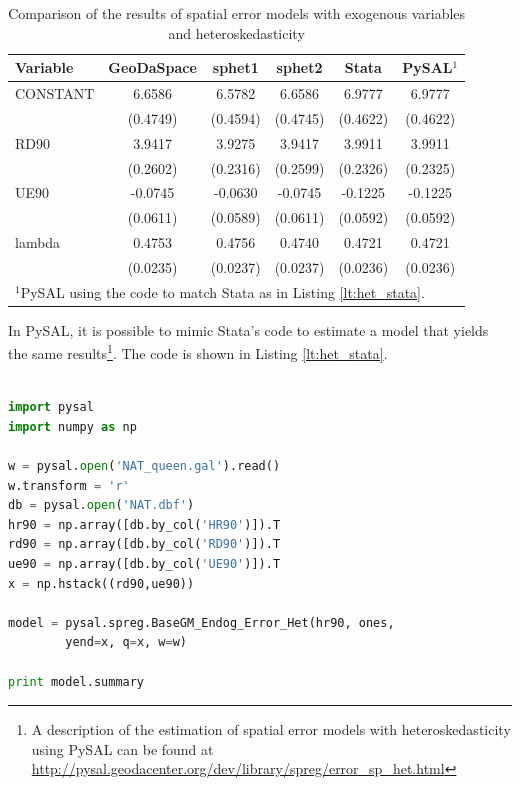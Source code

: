 \documentclass{article}
\begin{document}
\begin{table}[htpb]
\caption{Comparison of the results of spatial error models with exogenous variables and heteroskedasticity}
\label{t:res_het}
\centering
\begin{small}
\begin{tabular}{l|ccccc} \hline
\textbf{Variable}&\textbf{GeoDaSpace}&\textbf{sphet1}&\textbf{sphet2}&\textbf{Stata}&\textbf{PySAL$^1$}\\ \hline
CONSTANT&6.6586&6.5782&6.6586&6.9777&6.9777\\
&(0.4749)&(0.4594)&(0.4745)&(0.4622)&(0.4622)\\
RD90&3.9417&3.9275&3.9417&3.9911&3.9911\\
&(0.2602)&(0.2316)&(0.2599)&(0.2326)&(0.2325)\\
UE90&-0.0745&-0.0630&-0.0745&-0.1225&-0.1225\\
&(0.0611)&(0.0589)&(0.0611)&(0.0592)&(0.0592)\\
lambda&0.4753&0.4756&0.4740&0.4721&0.4721\\
&(0.0235)&(0.0237)&(0.0237)&(0.0236)&(0.0236)\\
\hline
\multicolumn{6}{l}{\scriptsize{$^1$PySAL using the code to match Stata as in Listing \ref{lt:het_stata}.}} \\
\end{tabular}
\end{small}
\end{table}

In PySAL, it is possible to mimic Stata's code to estimate a model that yields the same results\footnote{A description of the estimation of spatial error models with heteroskedasticity using PySAL can be found at \url{http://pysal.geodacenter.org/dev/library/spreg/error_sp_het.html}}. The code is shown in Listing \ref{lt:het_stata}.

\begin{code}
\begin{lstlisting}[label=lt:het_stata,caption=Using PySAL to match the results of spatial error models with heteroskedasticity from Stata,language=Python]

import pysal
import numpy as np

w = pysal.open('NAT_queen.gal').read()
w.transform = 'r'
db = pysal.open('NAT.dbf')
hr90 = np.array([db.by_col('HR90')]).T
rd90 = np.array([db.by_col('RD90')]).T
ue90 = np.array([db.by_col('UE90')]).T
x = np.hstack((rd90,ue90))

model = pysal.spreg.BaseGM_Endog_Error_Het(hr90, ones,
        yend=x, q=x, w=w)

print model.summary

\end{lstlisting}
\end{code}
\end{document}
